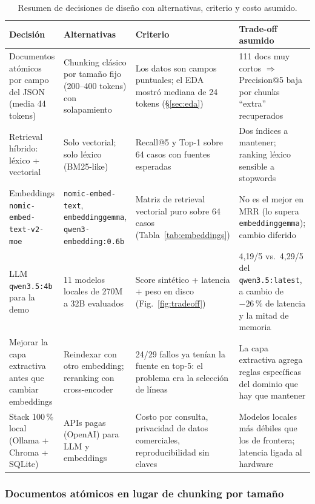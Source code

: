 \documentclass[11pt,a4paper]{article}
\newcommand{\code}[1]{\texttt{#1}}
\begin{document}
\begin{table}[H]
\centering
\small
\begin{tabular}{p{3.4cm}p{3.6cm}p{3.6cm}p{3.6cm}}
\toprule
\textbf{Decisión} & \textbf{Alternativas} & \textbf{Criterio} & \textbf{Trade-off asumido} \\
\midrule
Documentos atómicos por campo del JSON (media 44 tokens) &
Chunking clásico por tamaño fijo (200--400 tokens) con solapamiento &
Los datos son campos puntuales; el EDA mostró mediana de 24 tokens
(§\ref{sec:eda}) &
111 docs muy cortos $\Rightarrow$ Precision@5 baja por chunks ``extra''
recuperados \\
\addlinespace
Retrieval híbrido: léxico + vectorial &
Solo vectorial; solo léxico (BM25-like) &
Recall@5 y Top-1 sobre 64 casos con fuentes esperadas &
Dos índices a mantener; ranking léxico sensible a stopwords \\
\addlinespace
Embeddings \code{nomic-embed-text-v2-moe} &
\code{nomic-embed-text}, \code{embeddinggemma}, \code{qwen3-embedding:0.6b} &
Matriz de retrieval vectorial puro sobre 64 casos
(Tabla~\ref{tab:embeddings}) &
No es el mejor en MRR (lo supera \code{embeddinggemma}); cambio diferido \\
\addlinespace
LLM \code{qwen3.5:4b} para la demo &
11 modelos locales de 270M a 32B evaluados &
Score sintético + latencia + peso en disco (Fig.~\ref{fig:tradeoff}) &
4{,}19/5 vs.\ 4{,}29/5 del \code{qwen3.5:latest}, a cambio de
$-26\,\%$ de latencia y la mitad de memoria \\
\addlinespace
Mejorar la capa extractiva antes que cambiar embeddings &
Reindexar con otro embedding; reranking con cross-encoder &
24/29 fallos ya tenían la fuente en top-5: el problema era la selección de
líneas &
La capa extractiva agrega reglas específicas del dominio que hay que
mantener \\
\addlinespace
Stack 100\,\% local (Ollama + Chroma + SQLite) &
APIs pagas (OpenAI) para LLM y embeddings &
Costo por consulta, privacidad de datos comerciales, reproducibilidad
sin claves &
Modelos locales más débiles que los de frontera; latencia ligada al
hardware \\
\bottomrule
\end{tabular}
\caption{Resumen de decisiones de diseño con alternativas, criterio y costo asumido.}
\label{tab:decisiones}
\end{table}

\subsubsection{Documentos atómicos en lugar de chunking por tamaño}
\end{document}
